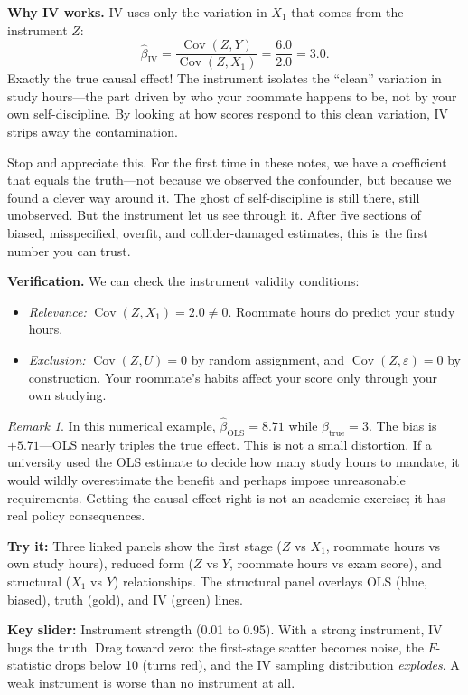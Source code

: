 \documentclass[11pt,a4paper]{article}
\theoremstyle{definition}
\theoremstyle{plain}
\theoremstyle{remark}
\newtheorem{remark}{Remark}[section]
\newcommand{\Cov}{\operatorname{Cov}}
\newcommand{\bols}{\hat{\beta}_{\text{OLS}}}
\newcommand{\biv}{\hat{\beta}_{\text{IV}}}
\begin{document}
\begin{numermark}[title={Roommate Study Hours as an Instrument}]
\textbf{Why IV works.} IV uses only the variation in $X_1$ that comes from the instrument $Z$:
\[
  \biv = \frac{\Cov(Z, Y)}{\Cov(Z, X_1)} = \frac{6.0}{2.0} = 3.0.
\]
Exactly the true causal effect! The instrument isolates the ``clean'' variation in study hours---the part driven by who your roommate happens to be, not by your own self-discipline. By looking at how scores respond to this clean variation, IV strips away the contamination.

\begin{keyinsight}[title={The First Correct Coefficient}]
Stop and appreciate this. For the first time in these notes, we have a coefficient that equals the truth---not because we observed the confounder, but because we found a clever way around it. The ghost of self-discipline is still there, still unobserved. But the instrument let us see through it. After five sections of biased, misspecified, overfit, and collider-damaged estimates, this is the first number you can trust.
\end{keyinsight}

\textbf{Verification.} We can check the instrument validity conditions:
\begin{itemize}[nosep]
  \item \emph{Relevance:} $\Cov(Z, X_1) = 2.0 \neq 0$. Roommate hours do predict your study hours. \checkmark
  \item \emph{Exclusion:} $\Cov(Z, U) = 0$ by random assignment, and $\Cov(Z, \varepsilon) = 0$ by construction. Your roommate's habits affect your score only through your own studying. \checkmark
\end{itemize}
\end{numermark}

\begin{remark}
In this numerical example, $\bols = 8.71$ while $\beta_{\text{true}} = 3$. The bias is $+5.71$---OLS nearly triples the true effect. This is not a small distortion. If a university used the OLS estimate to decide how many study hours to mandate, it would wildly overestimate the benefit and perhaps impose unreasonable requirements. Getting the causal effect right is not an academic exercise; it has real policy consequences.
\end{remark}

\begin{vizspec}[title={``The Backdoor and the Detour'' --- IV Strength Simulator}]
\textbf{Try it:} Three linked panels show the first stage ($Z$ vs $X_1$, roommate hours vs own study hours), reduced form ($Z$ vs $Y$, roommate hours vs exam score), and structural ($X_1$ vs $Y$) relationships. The structural panel overlays OLS (blue, biased), truth (gold), and IV (green) lines.

\textbf{Key slider:} Instrument strength (0.01 to 0.95). With a strong instrument, IV hugs the truth. Drag toward zero: the first-stage scatter becomes noise, the $F$-statistic drops below 10 (turns red), and the IV sampling distribution \emph{explodes}. A weak instrument is worse than no instrument at all.
\end{vizspec}
\end{document}
